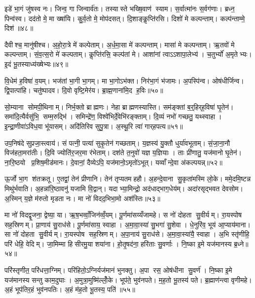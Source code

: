 इडे॑ भा॒गं जु॑षस्व नः। जिन्व॒ गा जिन्वार्व॑तः। तस्यास्ते भख्षि॒वाण॑ स्याम। स॒र्वात्मा॑नः स॒र्वग॑णाः। ब्रध्न॒ पिन्व॑स्व। दद॑तो मे॒ मा ख्षा॑यि। कु॒र्व॒तो मे॒ मोप॑दसत्। दि॒शाङ्कॢप्ति॑रसि। दिशो॑ मे कल्पन्ताम्। कल्प॑न्ताम्मे॒ दिश॑॥४८॥

दैवीश्च॒ मानु॑षीश्च। अ॒हो॒रा॒त्रे मे॑ कल्पेताम्। अ॒र्ध॒मा॒सा मे॑ कल्पन्ताम्। मासा॑ मे कल्पन्ताम्। ऋ॒तवो॑ मे कल्पन्ताम्। सं॒व॒त्स॒रो मे॑ कल्पताम्। कॢप्ति॑रसि॒ कल्प॑तां मे। आशा॑नां त्वाऽऽशापा॒लेभ्य॑। च॒तुर्भ्यो॑ अ॒मृतेभ्यः। इ॒दं भू॒तस्याध्य॑ख्षेभ्यः॥४९॥

वि॒धेम॑ ह॒विषा॑ व॒यम्। भज॑तां भा॒गी भा॒गम्। मा भा॒गोऽभ॑क्त। निर॑भा॒गं भ॑जामः। अ॒पस्पि॑न्व। ओष॑धीर्जिन्व। द्वि॒पात्पा॑हि। चतु॑ष्पादव। दि॒वो वृष्टि॒मेर॑य। ब्रा॒ह्म॒णाना॑मि॒द ह॒विः॥५०॥

सो॒म्याना सोमपी॒थिनाम्। निर्भ॒क्तो ब्राह्मणः। नेहा ब्राह्मणस्यास्ति। सम॑ङ्क्तां ब॒र्॒हिर्‌ह॒विषा॑ घृ॒तेन॑। समा॑दि॒त्यैर्वसु॑भि॒ सम्म॒रुद्भि॑। समिन्द्रे॑ण॒ विश्वे॑भिर्दे॒वेभि॑रङ्क्ताम्। दि॒व्यं नभो॑ गच्छतु॒ यथ्स्वाहा। इ॒न्द्रा॒णीवा॑ऽविध॒वा भू॑यासम्। अदि॑तिरिव सुपु॒त्रा। अ॒स्थू॒रि त्वा॑ गार्‌हपत्य॥५१॥

उप॒निष॑दे सुप्रजा॒स्त्वाय॑। सं पत्नी॒ पत्या॑ सुकृ॒तेन॑ गच्छताम्। य॒ज्ञस्य॑ यु॒क्तौ धुर्या॑वभूताम्। सं॒जा॒ना॒नौ विज॑हता॒मरा॑तीः। दि॒वि ज्योति॑र॒जर॒मा र॑भेताम्। दश॑ते त॒नुवो॑ यज्ञ य॒ज्ञियाः। ताः प्री॑णातु॒ यज॑मानो घृ॒तेन॑। ना॒रि॒ष्ठयो प्र॒शिष॒मीड॑मानः। दे॒वानां॒ दैव्येऽपि॒ यज॑मानो॒ऽमृतो॑ऽभूत्। यव्वाँन्दे॒वा अ॑कल्पयन्न्॥५२॥

ऊ॒र्जो भा॒ग श॑तक्रतू। ए॒तद्वां॒ तेन॑ प्रीणानि। तेन॑ तृप्यतमहहौ। अ॒हन्दे॒वाना सु॒कृता॑मस्मि लो॒के। ममे॒दमि॒ष्टन्न मिथु॑र्भवाति। अ॒हन्ना॑रि॒ष्ठावनु॑ यजामि वि॒द्वान्। यदाभ्या॒मिन्द्रो॒ अद॑धाद्भाग॒धेय॑म्। अदा॑रसृद्भवत देवसोम। अ॒स्मिन् य॒ज्ञे म॑रुतो मृडता नः। मा नो॑ विदद॒भिभा॒मो अश॑स्तिः॥५३॥

मा नो॑ विदद्वृ॒जना॒ द्वेष्या॒ या। ऋ॒ष॒भव्वाँ॒जिन॑व्वँ॒यम्। पू॒र्णमा॑सय्यँजामहे। स नो॑ दोहता सु॒वीर्यम्। रा॒यस्पोष सह॒स्रिणम्। प्रा॒णाय॑ सु॒राध॑से। पू॒र्णमा॑साय॒ स्वाहा। अ॒मा॒वा॒स्या॑ सु॒भगा॑ सु॒शेवा। धे॒नुरि॑व॒ भूय॑ आ॒प्याय॑माना। सा नो॑ दोहता सु॒वीर्यम्। रा॒यस्पोष सह॒स्रिणम्। अ॒पा॒नाय॑ सु॒राध॑से। अ॒मा॒वा॒स्या॑यै॒ स्वाहा। अ॒भि स्तृ॑णीहि॒ परि॑ धेहि॒ वेदिम्। जा॒मिम्मा हिसीरमु॒या शया॑ना। हो॒तृ॒षद॑ना॒ हरि॑ताः सु॒वर्णाः। नि॒ष्का इ॒मे यज॑मानस्य ब्र॒ध्ने॥५४॥

परि॑स्तृणीत॒ परि॑धत्ता॒ग्निम्। परि॑हितो॒ऽग्निर्यज॑मानं भुनक्तु। अ॒पा रस॒ ओष॑धीना सु॒वर्ण॑। नि॒ष्का इ॒मे यज॑मानस्य सन्तु काम॒दुघाः। अ॒मुत्रा॒मुष्मि॑ल्लोँ॒के। भूप॑ते॒ भुव॑नपते। म॒ह॒तो भू॒तस्य॑ पते। ब्र॒ह्माण॑न्त्वा वृणीमहे। अ॒हं भूप॑तिर॒हं भुव॑नपतिः। अ॒हं म॑ह॒तो भू॒तस्य॒ पति॑॥५५॥

